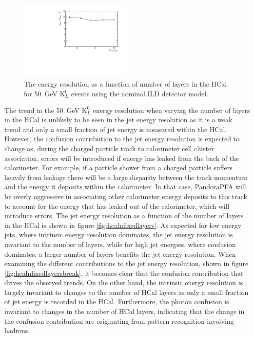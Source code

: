 \begin{figure}[h!]
\centering
\includegraphics[width=0.5\textwidth]{OptimisationStudies/Plots/EnergyResolution/ER_vs_HCalNFixedLayers_50GeVKaon0L.pdf}
\caption[The energy resolution as a function of number of layers in the HCal for 50~GeV $\text{K}^{0}_{L}$ events using the nominal ILD detector model.]{The energy resolution as a function of number of layers in the HCal for 50~GeV $\text{K}^{0}_{L}$ events using the nominal ILD detector model.}
\label{fig:hcalnfixedlayerser}
\end{figure}

The trend in the 50~GeV $\text{K}^{0}_{L}$ energy resolution when varying the number of layers in the HCal is unlikely to be seen in the jet energy resolution as it is a weak trend and only a small fraction of jet energy is measured within the HCal.  However, the confusion contribution to the jet energy resolution is expected to change as, during the charged particle track to calorimeter cell cluster association, errors will be introduced if energy has leaked from the back of the calorimeter.  For example, if a particle shower from a charged particle suffers heavily from leakage there will be a large disparity between the track momentum and the energy it deposits within the calorimeter.  In that case, PandoraPFA will be overly aggressive in associating other calorimeter energy deposits to this track to account for the energy that has leaked out of the calorimeter, which will introduce errors.  The jet energy resolution as a function of the number of layers in the HCal is shown in figure \ref{fig:hcalnfixedlayers}.  As expected for low energy jets, where intrinsic energy resolution dominates, the jet energy resolution is invariant to the number of layers, while for high jet energies, where confusion dominates, a larger number of layers benefits the jet energy resolution.  When examining the different contributions to the jet energy resolution, shown in figure \ref{fig:hcalnfixedlayersbreak}, it becomes clear that the confusion contribution that drives the observed trends.  On the other hand, the intrinsic energy resolution is largely invariant to changes to the number of HCal layers as only a small fraction of jet energy is recorded in the HCal.  Furthermore, the photon confusion is invariant to changes in the number of HCal layers, indicating that the change in the confusion contribution are originating from pattern recognition involving hadrons.

